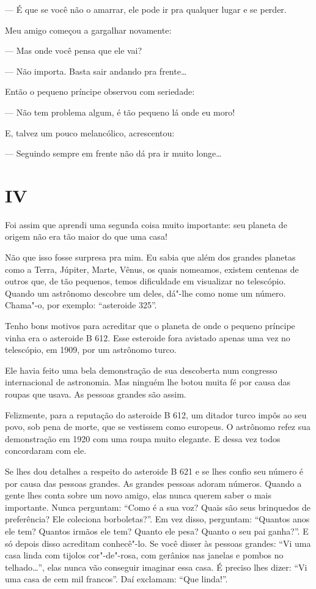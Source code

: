 \begin{Parallel}[p]{}{}
{--- É que se você não o amarrar, ele pode ir pra qualquer lugar e se
perder.

Meu amigo começou a gargalhar novamente:

--- Mas onde você pensa que ele vai?

--- Não importa. Basta sair andando pra frente\ldots{}

Então o pequeno príncipe observou com seriedade:

--- Não tem problema algum, é tão pequeno lá onde eu moro!

E, talvez um pouco melancólico, acrescentou:

--- Seguindo sempre em frente não dá pra ir muito longe\ldots{}

\section{IV}

Foi assim que aprendi uma segunda coisa muito importante: seu planeta de
origem não era tão maior do que uma casa!

Não que isso fosse surpresa pra mim. Eu sabia que além dos grandes
planetas como a Terra, Júpiter, Marte, Vênus, os quais nomeamos, existem
centenas de outros que, de tão pequenos, temos dificuldade em visualizar
no telescópio. Quando um astrônomo descobre um deles, dá"-lhe como nome
um número. Chama"-o, por exemplo: ``asteroide 325''.

Tenho bons motivos para acreditar que o planeta de onde o pequeno
príncipe vinha era o asteroide B 612. Esse esteroide fora avistado
apenas uma vez no telescópio, em 1909, por um astrônomo turco.

Ele havia feito uma bela demonstração de sua descoberta num congresso
internacional de astronomia. Mas ninguém lhe botou muita fé por causa
das roupas que usava. As pessoas grandes são assim.

Felizmente, para a reputação do asteroide B 612, um ditador turco impôs
ao seu povo, sob pena de morte, que se vestissem como europeus. O
astrônomo refez sua demonstração em 1920 com uma roupa muito elegante. E
dessa vez todos concordaram com ele.

Se lhes dou detalhes a respeito do asteroide B 621 e se lhes confio seu
número é por causa das pessoas grandes. As grandes pessoas adoram
números. Quando a gente lhes conta sobre um novo amigo, elas nunca
querem saber o mais importante. Nunca perguntam: ``Como é a sua voz?
Quais são seus brinquedos de preferência? Ele coleciona borboletas?''.
Em vez disso, perguntam: ``Quantos anos ele tem? Quantos irmãos ele tem?
Quanto ele pesa? Quanto o seu pai ganha?''. E só depois disso acreditam
conhecê"-lo. Se você disser às pessoas grandes: ``Vi uma casa linda com
tijolos cor"-de"-rosa, com gerânios nas janelas e pombos no telhado\ldots{}'',
elas nunca vão conseguir imaginar essa casa. É preciso lhes dizer: ``Vi
uma casa de cem mil francos''. Daí exclamam: ``Que linda!''.

}
\end{Parallel}
